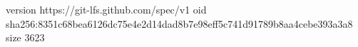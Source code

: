 version https://git-lfs.github.com/spec/v1
oid sha256:8351c68bea6126dc75e4e2d14dad8b7e98eff5c741d91789b8aa4cebe393a3a8
size 3623
